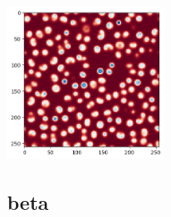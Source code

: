 \begin{center}
\includegraphics[height=4.5cm]{python_codes/fieldstone_171/results/alpha2_solution_final_v.png}
\end{center}

\subsection*{beta}

